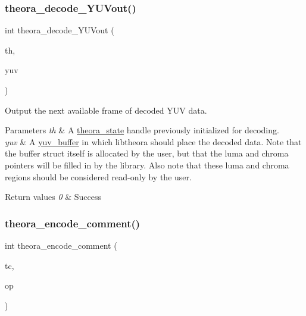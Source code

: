 \subsubsection{\texorpdfstring{theora\+\_\+decode\+\_\+\+Y\+U\+Vout()}{theora\_decode\_YUVout()}}
{\footnotesize\ttfamily int theora\+\_\+decode\+\_\+\+Y\+U\+Vout (\begin{DoxyParamCaption}\item[{\hyperlink{structtheora__state}{theora\+\_\+state} $\ast$}]{th,  }\item[{\hyperlink{structyuv__buffer}{yuv\+\_\+buffer} $\ast$}]{yuv }\end{DoxyParamCaption})}

Output the next available frame of decoded Y\+UV data. 
\begin{DoxyParams}{Parameters}
{\em th} & A \hyperlink{structtheora__state}{theora\+\_\+state} handle previously initialized for decoding. \\
\hline
{\em yuv} & A \hyperlink{structyuv__buffer}{yuv\+\_\+buffer} in which libtheora should place the decoded data. Note that the buffer struct itself is allocated by the user, but that the luma and chroma pointers will be filled in by the library. Also note that these luma and chroma regions should be considered read-\/only by the user. \\
\hline
\end{DoxyParams}

\begin{DoxyRetVals}{Return values}
{\em 0} & Success \\
\hline
\end{DoxyRetVals}
\mbox{\label{group__oldfuncs_ga45e8db0713eaaca0f1144f3724cb834a}} 
\subsubsection{\texorpdfstring{theora\+\_\+encode\+\_\+comment()}{theora\_encode\_comment()}}
{\footnotesize\ttfamily int theora\+\_\+encode\+\_\+comment (\begin{DoxyParamCaption}\item[{\hyperlink{structtheora__comment}{theora\+\_\+comment} $\ast$}]{tc,  }\item[{\hyperlink{structogg__packet}{ogg\+\_\+packet} $\ast$}]{op }\end{DoxyParamCaption})}

